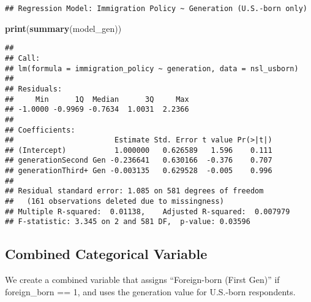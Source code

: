 \documentclass[
]{article}
\newenvironment{Shaded}{\begin{snugshade}}{\end{snugshade}}
\newcommand{\AttributeTok}[1]{\textcolor[rgb]{0.13,0.29,0.53}{#1}}
\newcommand{\DecValTok}[1]{\textcolor[rgb]{0.00,0.00,0.81}{#1}}
\newcommand{\FunctionTok}[1]{\textcolor[rgb]{0.13,0.29,0.53}{\textbf{#1}}}
\newcommand{\NormalTok}[1]{#1}
\newcommand{\OtherTok}[1]{\textcolor[rgb]{0.56,0.35,0.01}{#1}}
\newcommand{\SpecialCharTok}[1]{\textcolor[rgb]{0.81,0.36,0.00}{\textbf{#1}}}
\newcommand{\StringTok}[1]{\textcolor[rgb]{0.31,0.60,0.02}{#1}}
\begin{document}
\begin{verbatim}
## Regression Model: Immigration Policy ~ Generation (U.S.-born only)
\end{verbatim}

\begin{Shaded}
\begin{Highlighting}[]
\FunctionTok{print}\NormalTok{(}\FunctionTok{summary}\NormalTok{(model\_gen))}
\end{Highlighting}
\end{Shaded}

\begin{verbatim}
## 
## Call:
## lm(formula = immigration_policy ~ generation, data = nsl_usborn)
## 
## Residuals:
##     Min      1Q  Median      3Q     Max 
## -1.0000 -0.9969 -0.7634  1.0031  2.2366 
## 
## Coefficients:
##                       Estimate Std. Error t value Pr(>|t|)
## (Intercept)           1.000000   0.626589   1.596    0.111
## generationSecond Gen -0.236641   0.630166  -0.376    0.707
## generationThird+ Gen -0.003135   0.629528  -0.005    0.996
## 
## Residual standard error: 1.085 on 581 degrees of freedom
##   (161 observations deleted due to missingness)
## Multiple R-squared:  0.01138,    Adjusted R-squared:  0.007979 
## F-statistic: 3.345 on 2 and 581 DF,  p-value: 0.03596
\end{verbatim}

\subsection{Combined Categorical
Variable}\label{combined-categorical-variable}

We create a combined variable that assigns ``Foreign-born (First Gen)''
if foreign\_born == 1, and uses the generation value for U.S.-born
respondents.

\begin{Shaded}
\end{Shaded}
\end{document}
